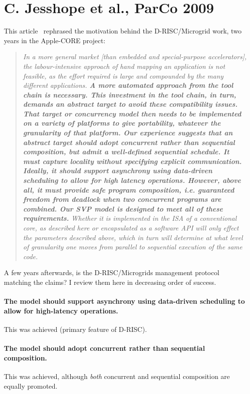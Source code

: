 \section{C. Jesshope et al., ParCo 2009}

This article~\cite{jesshope.09.parco} rephrased the motivation
behind the D-RISC/Microgrid work, two years in the Apple-CORE project:

\begin{quote}
\itshape In a more general market [than embedded and special-purpose
  accelerators], the labour-intensive approach of hand mapping an
application is not feasible, as the effort required is large and
compounded by the many different applications. {\bfseries A more automated
approach from the tool chain is necessary. This investment in the tool
chain, in turn, demands an abstract target to avoid these
compatibility issues. That target or concurrency model then needs to
be implemented on a variety of platforms to give portability, whatever
the granularity of that platform.  Our experience suggests that an
abstract target should adopt concurrent rather than sequential
composition, but admit a well-defined sequential schedule. It must
capture locality without specifying explicit communication. Ideally,
it should support asynchrony using data-driven scheduling to allow for
high latency operations. However, above all, it must provide safe
program composition, i.e. guaranteed freedom from deadlock when two
concurrent programs are combined. Our SVP model is designed to meet
all of these requirements.} Whether it is implemented in the ISA of a
conventional core, as described here or encapsulated as a software API
will only effect the parameters described above, which in turn will
determine at what level of granularity one moves from parallel to
sequential execution of the same code.
\end{quote}

A few years afterwards, is the D-RISC/Microgrids management protocol
matching the claims? I review them here in decreasing order of
success.

\paragraph{The model should support asynchrony using data-driven scheduling to
allow for high-latency operations.} This was achieved (primary feature of D-RISC).

\paragraph{The model should adopt concurrent rather than sequential composition.}
This was achieved, although \emph{both} concurrent and sequential composition are equally promoted.

